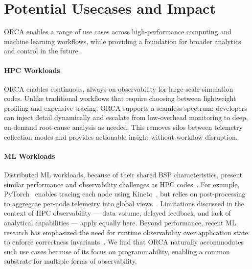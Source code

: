 \section{Potential Usecases and Impact}

ORCA enables a range of use cases across high-performance computing and machine learning workflows,
while providing a foundation for broader analytics and control in the future.

\paragraph{HPC Workloads}
ORCA enables continuous, always-on observability for large-scale simulation codes.
Unlike traditional workflows that require choosing between lightweight profiling and expensive
tracing, ORCA supports a seamless spectrum: developers can inject detail dynamically and escalate
from low-overhead monitoring to deep, on-demand root-cause analysis as needed.
This removes silos between telemetry collection modes and provides actionable insight without
workflow disruption.

\paragraph{ML Workloads}
Distributed ML workloads, because of their shared BSP characteristics, present similar performance
and observability challenges as HPC codes~\cite{Gangi2024:RDMA}.
For example, PyTorch~\cite{Paszk2019:PyTorch} enables tracing each node using
Kineto~\cite{2025:kineto}, but relies on post-processing to aggregate per-node telemetry into
global views~\cite{:HTA}.
Limitations discussed in the context of HPC observability --- data volume, delayed feedback, and
lack of analytical capabilities --- apply equally here.
Beyond performance, recent ML research has emphasized the need for runtime observability over
application state to enforce correctness invariants~\cite{Jiang2025:TrainCheck}.
We find that ORCA naturally accommodates such use cases because of its focus on programmability,
enabling a common substrate for multiple forms of observability.

